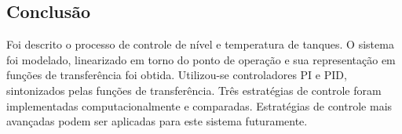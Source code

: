 \documentclass[a0,portrait]{a0poster}
\begin{document}
\begin{multicols}{2}
\color{DarkSlateGray} %

\section*{Conclusão}

\color{Black}

Foi descrito o processo de controle de nível e temperatura de tanques. O sistema foi modelado, linearizado em torno do ponto de operação e sua representação em funções de transferência foi obtida. Utilizou-se controladores PI e PID, sintonizados pelas funções de transferência. Três estratégias de controle foram implementadas computacionalmente e comparadas. Estratégias de controle mais avançadas podem ser aplicadas para este sistema futuramente. 



\end{multicols}
\end{document}
